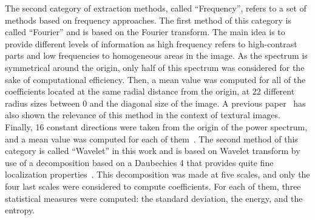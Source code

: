 \documentclass[journal,article,accept,moreauthors,pdftex, applsci]{Definitions/mdpi}
\begin{document}
The second category of extraction methods, called “Frequency”, refers to a set of methods based on frequency approaches. The first method of this category is called “Fourier” and is based on the Fourier transform. The main idea is to provide different levels of information as high frequency refers to high-contrast parts and low frequencies to homogeneous areas in the image. As the spectrum is symmetrical around the origin, only half of this spectrum was considered for the sake of computational efficiency. Then, a mean value was computed for all of the coefficients located at the same radial distance from the origin, at 22 different radius sizes between 0 and the diagonal size of the image. A previous paper~\cite{Smach2008a} has also shown the relevance of this method in the context of textural images. Finally, 16 constant directions were taken from the origin of the power spectrum, and a mean value was computed for each of them~\cite{Wiltgen2008}. The second method of this category is called “Wavelet” in this work and is based on Wavelet transform by use of a decomposition based on a Daubechies 4 that provides quite fine localization properties~\cite{Wiltgen2008}. This decomposition was made at five scales, and only the four last scales were considered to compute coefficients. For each of them, three statistical measures were computed: the standard deviation, the energy, and the entropy.\par
\end{document}
